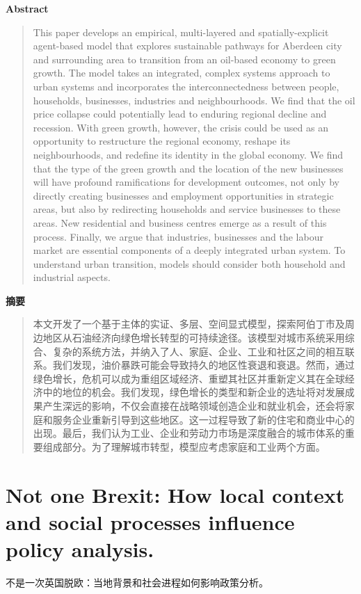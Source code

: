\vspace{1.5em}
\noindent\textbf{Abstract}\par
\begin{quote}\small
This paper develops an empirical, multi-layered and spatially-explicit agent-based model that explores sustainable pathways for Aberdeen city and surrounding area to transition from an oil-based economy to green growth. The model takes an integrated, complex systems approach to urban systems and incorporates the interconnectedness between people, households, businesses, industries and neighbourhoods. We find that the oil price collapse could potentially lead to enduring regional decline and recession. With green growth, however, the crisis could be used as an opportunity to restructure the regional economy, reshape its neighbourhoods, and redefine its identity in the global economy. We find that the type of the green growth and the location of the new businesses will have profound ramifications for development outcomes, not only by directly creating businesses and employment opportunities in strategic areas, but also by redirecting households and service businesses to these areas. New residential and business centres emerge as a result of this process. Finally, we argue that industries, businesses and the labour market are essential components of a deeply integrated urban system. To understand urban transition, models should consider both household and industrial aspects.
\end{quote}

\noindent\textbf{摘要}\par
\begin{quote}\small
本文开发了一个基于主体的实证、多层、空间显式模型，探索阿伯丁市及周边地区从石油经济向绿色增长转型的可持续途径。该模型对城市系统采用综合、复杂的系统方法，并纳入了人、家庭、企业、工业和社区之间的相互联系。我们发现，油价暴跌可能会导致持久的地区性衰退和衰退。然而，通过绿色增长，危机可以成为重组区域经济、重塑其社区并重新定义其在全球经济中的地位的机会。我们发现，绿色增长的类型和新企业的选址将对发展成果产生深远的影响，不仅会直接在战略领域创造企业和就业机会，还会将家庭和服务企业重新引导到这些地区。这一过程导致了新的住宅和商业中心的出现。最后，我们认为工业、企业和劳动力市场是深度融合的城市体系的重要组成部分。为了理解城市转型，模型应考虑家庭和工业两个方面。
\end{quote}

\vspace{0.5em}
\chapter{Not one Brexit: How local context and social processes influence policy analysis.}
\begin{center}\small 不是一次英国脱欧：当地背景和社会进程如何影响政策分析。\end{center}

